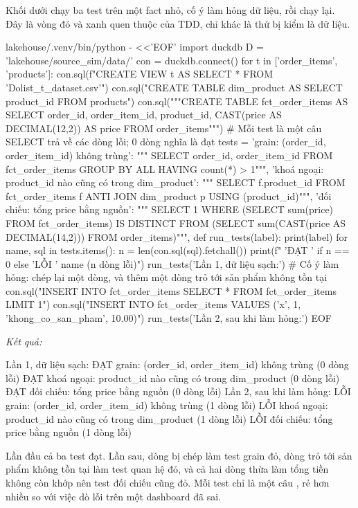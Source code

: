 Khối dưới chạy ba test trên một fact nhỏ, cố ý làm hỏng dữ liệu, rồi chạy lại. Đây là vòng đỏ và xanh quen thuộc của TDD, chỉ khác là thứ bị kiểm là dữ liệu.

\begin{codeblock}
lakehouse/.venv/bin/python - <<'EOF'
import duckdb
D = 'lakehouse/source_sim/data/'
con = duckdb.connect()
for t in ['order_items', 'products']:
    con.sql(f"CREATE VIEW {t} AS SELECT * FROM '{D}olist_{t}_dataset.csv'")
con.sql("CREATE TABLE dim_product AS SELECT product_id FROM products")
con.sql("""CREATE TABLE fct_order_items AS
  SELECT order_id, order_item_id, product_id, CAST(price AS DECIMAL(12,2)) AS price
  FROM order_items""")
# Mỗi test là một câu SELECT trả về các dòng lỗi; 0 dòng nghĩa là đạt
tests = {
  'grain: (order_id, order_item_id) không trùng': """
     SELECT order_id, order_item_id FROM fct_order_items
     GROUP BY ALL HAVING count(*) > 1""",
  'khoá ngoại: product_id nào cũng có trong dim_product': """
     SELECT f.product_id FROM fct_order_items f
     ANTI JOIN dim_product p USING (product_id)""",
  'đối chiếu: tổng price bằng nguồn': """
     SELECT 1 WHERE (SELECT sum(price) FROM fct_order_items)
       IS DISTINCT FROM
       (SELECT sum(CAST(price AS DECIMAL(14,2))) FROM order_items)""",
}
def run_tests(label):
    print(label)
    for name, sql in tests.items():
        n = len(con.sql(sql).fetchall())
        print(f"  {'ĐẠT ' if n == 0 else 'LỖI '} {name} ({n} dòng lỗi)")
run_tests('Lần 1, dữ liệu sạch:')
# Cố ý làm hỏng: chép lại một dòng, và thêm một dòng trỏ tới sản phẩm không tồn tại
con.sql("INSERT INTO fct_order_items SELECT * FROM fct_order_items LIMIT 1")
con.sql("INSERT INTO fct_order_items VALUES ('x', 1, 'khong_co_san_pham', 10.00)")
run_tests('Lần 2, sau khi làm hỏng:')
EOF
\end{codeblock}
\textit{Kết quả:}
\begin{codeblock}
Lần 1, dữ liệu sạch:
  ĐẠT  grain: (order_id, order_item_id) không trùng (0 dòng lỗi)
  ĐẠT  khoá ngoại: product_id nào cũng có trong dim_product (0 dòng lỗi)
  ĐẠT  đối chiếu: tổng price bằng nguồn (0 dòng lỗi)
Lần 2, sau khi làm hỏng:
  LỖI  grain: (order_id, order_item_id) không trùng (1 dòng lỗi)
  LỖI  khoá ngoại: product_id nào cũng có trong dim_product (1 dòng lỗi)
  LỖI  đối chiếu: tổng price bằng nguồn (1 dòng lỗi)
\end{codeblock}

Lần đầu cả ba test đạt. Lần sau, dòng bị chép làm test grain đỏ, dòng trỏ tới sản phẩm không tồn tại làm test quan hệ đỏ, và cả hai dòng thừa làm tổng tiền không còn khớp nên test đối chiếu cũng đỏ. Mỗi test chỉ là một câu , rẻ hơn nhiều so với việc dò lỗi trên một dashboard đã sai.


